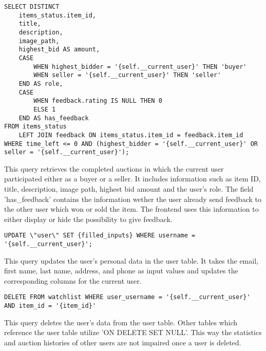 \begin{lstlisting}[style=sqlStyle]
SELECT DISTINCT
	items_status.item_id, 
	title, 
	description, 
	image_path, 
	highest_bid AS amount, 
	CASE 
		WHEN highest_bidder = '{self.__current_user}' THEN 'buyer'
		WHEN seller = '{self.__current_user}' THEN 'seller'
	END AS role,
	CASE 
		WHEN feedback.rating IS NULL THEN 0
		ELSE 1
	END AS has_feedback
FROM items_status 
	LEFT JOIN feedback ON items_status.item_id = feedback.item_id
WHERE time_left <= 0 AND (highest_bidder = '{self.__current_user}' OR seller = '{self.__current_user}');
\end{lstlisting}
This query retrieves the completed auctions in which the current user participated either as a buyer or a seller. It includes information such as item ID, title, description, image path, highest bid amount and the user's role. The field 'has\_feedback' contains the information wether the user already send feedback to the other user which won or sold the item. The frontend uses this information to either display or hide the possibility to give feedback.

\begin{lstlisting}[style=sqlStyle]
UPDATE \"user\" SET {filled_inputs} WHERE username = '{self.__current_user}';
\end{lstlisting}
This query updates the user's personal data in the user table. It takes the email, first name, last name, address, and phone as input values and updates the corresponding columns for the current user.
\clearpage

\begin{lstlisting}[style=sqlStyle]
DELETE FROM watchlist WHERE user_username = '{self.__current_user}' AND item_id = '{item_id}'
\end{lstlisting}
This query deletes the user's data from the user table. Other tables which reference the user table utilize 'ON DELETE SET NULL'. This way the statistics and auction histories of other users are not impaired once a user is deleted.

